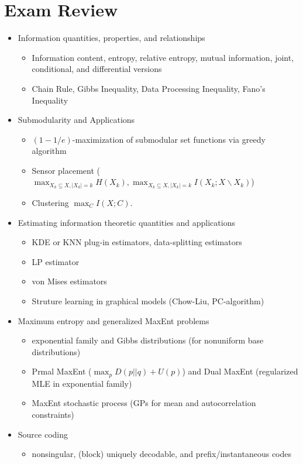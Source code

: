\documentclass{article}
\newcommand{\sminus}{\backslash}                    %
\begin{document}
\section{Exam Review}
\begin{itemize}
\item Information quantities, properties, and relationships
\begin{itemize}
\item Information content, entropy, relative entropy, mutual information,
joint, conditional, and differential versions
\item Chain Rule, Gibbs Inequality, Data Processing Inequality, Fano's
Inequality
\end{itemize}
\item Submodularity and Applications
\begin{itemize}
\item $(1 - 1/e)$-maximization of submodular set functions via greedy algorithm
\item Sensor placement ($\max_{X_k \subseteq X,|X_k| = k} H(X_k),
\max_{X_k \subseteq X,|X_k| = k} I(X_k;X \sminus X_k)$)
\item Clustering $\max_C I(X;C)$.
\end{itemize}
\item Estimating information theoretic quantities and applications
\begin{itemize}
\item KDE or KNN plug-in estimators, data-splitting estimators
\item LP estimator
\item von Mises estimators
\item Struture learning in graphical models (Chow-Liu, PC-algorithm)
\end{itemize}
\item Maximum entropy and generalized MaxEnt problems
\begin{itemize}
\item exponential family and Gibbs distributions (for nonuniform base
distributions)
\item Prmal MaxEnt ($\max_p D(p||q) + U(p)$) and Dual MaxEnt (regularized
MLE in exponential family)
\item MaxEnt stochastic process (GPs for mean and autocorrelation constraints)
\end{itemize}
\item Source coding
\begin{itemize}
\item nonsingular, (block) uniquely decodable, and prefix/instantaneous codes

\end{itemize}
\end{itemize}
\end{document}
